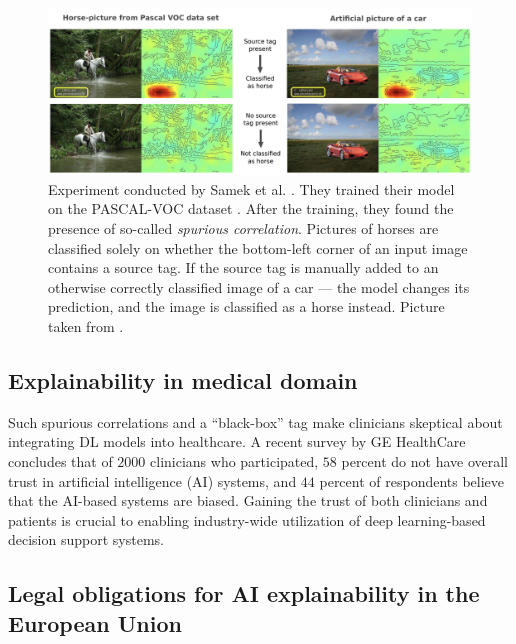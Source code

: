 \begin{figure}[!h]
    \begin{center}
    \begin{minipage}{1\textwidth}
      \includegraphics[width=\textwidth]{img/horse-tag.png}
    \end{minipage}
    \caption{Experiment conducted by Samek et al. \cite{xai-horse}. They trained their model on the PASCAL-VOC dataset \cite{pascal-voc}. After the training, they found the presence of so-called \emph{spurious correlation}. Pictures of horses are classified solely on whether the bottom-left corner of an input image contains a source tag. If the source tag is manually added to an otherwise correctly classified image of a car --- the model changes its prediction, and the image is classified as a horse instead. Picture taken from \cite{xai-horse}.}
    \label{fig:horse-tag}
    \end{center}

\end{figure}

\subsection*{Explainability in medical domain}

Such spurious correlations and a ``black-box'' tag make clinicians skeptical about integrating DL models into healthcare.
A recent survey by GE HealthCare \cite{ge-healthcare-survey} concludes that of $2000$ clinicians who participated, $58$ percent do not have overall trust in artificial intelligence (AI) systems, and $44$ percent of respondents believe that the AI-based systems are biased.
Gaining the trust of both clinicians and patients is crucial to enabling industry-wide utilization of deep learning-based decision support systems.

\subsection*{Legal obligations for AI explainability in the European Union}

